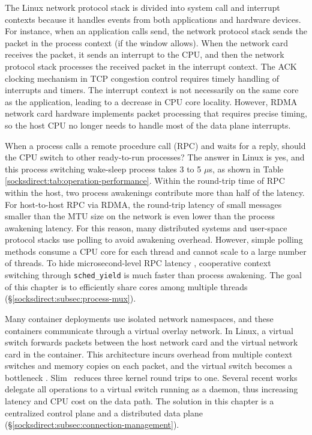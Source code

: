 The Linux network protocol stack is divided into system call and interrupt contexts because it handles events from both applications and hardware devices. For instance, when an application calls send, the network protocol stack sends the packet in the process context (if the window allows). When the network card receives the packet, it sends an interrupt to the CPU, and then the network protocol stack processes the received packet in the interrupt context. The ACK clocking mechanism in TCP congestion control \cite {mprdma} requires timely handling of interrupts and timers. The interrupt context is not necessarily on the same core as the application, leading to a decrease in CPU core locality. However, RDMA network card hardware implements packet processing that requires precise timing, so the host CPU no longer needs to handle most of the data plane interrupts.

When a process calls a remote procedure call (RPC) and waits for a reply, should the CPU switch to other ready-to-run processes? The answer in Linux is yes, and this process switching wake-sleep process takes 3 to 5 $\mu$s, as shown in Table \ref {socksdirect:tab:operation-performance}. Within the round-trip time of RPC within the host, two process awakenings contribute more than half of the latency. For host-to-host RPC via RDMA, the round-trip latency of small messages smaller than the MTU size on the network is even lower than the process awakening latency. For this reason, many distributed systems and user-space protocol stacks use polling to avoid awakening overhead. However, simple polling methods consume a CPU core for each thread and cannot scale to a large number of threads. To hide microsecond-level RPC latency \cite {barroso2017attack}, cooperative context switching through \texttt {sched\_yield} is much faster than process awakening. The goal of this chapter is to efficiently share cores among multiple threads (\S\ref{socksdirect:subsec:process-mux}).

Many container deployments use isolated network namespaces, and these containers communicate through a virtual overlay network. In Linux, a virtual switch \cite {pfaff2015design} forwards packets between the host network card and the virtual network card in the container. This architecture incurs overhead from multiple context switches and memory copies on each packet, and the virtual switch becomes a bottleneck \cite {pfefferle2015hybrid}. Slim~ \cite {slim} reduces three kernel round trips to one. Several recent works \cite {martins2014clickos,roghanchi2017ffwd,huang2017high,nsdi19freeflow} delegate all operations to a virtual switch running as a daemon, thus increasing latency and CPU cost on the data path. The solution in this chapter is a centralized control plane and a distributed data plane (\S\ref{socksdirect:subsec:connection-management}).

